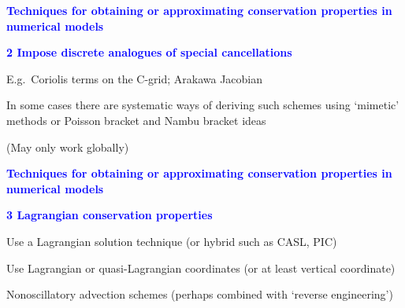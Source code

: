 \documentclass[a4]{seminar}
\newcommand{\B}[1]{\textcolor{blue}{#1}}
\begin{document}

\begin{slide}

\B{\bf Techniques for obtaining or approximating conservation
properties in numerical models}

\vspace{3mm}

\B{\bf 2 Impose discrete analogues of special cancellations}

\vspace{3mm}

E.g.\ Coriolis terms on the C-grid; Arakawa Jacobian

\vspace{3mm}

In some cases there are systematic ways of deriving such schemes
using `mimetic' methods or Poisson bracket and Nambu bracket ideas

\vspace{3mm}

(May only work globally)


\end{slide}


\begin{slide}

\B{\bf Techniques for obtaining or approximating conservation
properties in numerical models}

\vspace{3mm}

\B{\bf 3 Lagrangian conservation properties}

\vspace{2mm}

Use a Lagrangian solution technique (or hybrid such as CASL, PIC)

\vspace{2mm}

Use Lagrangian or quasi-Lagrangian coordinates
(or at least vertical coordinate)

\vspace{2mm}

Nonoscillatory advection schemes (perhaps combined with `reverse engineering')


\end{slide}

\end{document}
